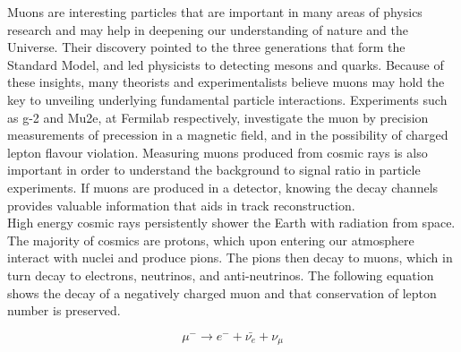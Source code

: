\documentclass[11pt,twocolumn]{article}
\begin{document}
\indent \indent
Muons are interesting particles that are important in many areas of physics research and may help in deepening our understanding of nature and the Universe. Their discovery pointed to the three generations that form the Standard Model, and led physicists to detecting mesons and quarks.\cite{symm} Because of these insights, many theorists and experimentalists believe muons may hold the key to unveiling underlying fundamental particle interactions. Experiments such as g-2 and Mu2e, at Fermilab respectively, investigate the muon by precision measurements of precession in a magnetic field, and in the possibility of charged lepton flavour violation. Measuring muons produced from cosmic rays is also important in order to understand the background to signal ratio in particle experiments. If muons are produced in a detector, knowing the decay channels provides valuable information that aids in track reconstruction. \\
\indent \indent
High energy cosmic rays persistently shower the Earth with radiation from space. The majority of cosmics are protons, which upon entering our atmosphere interact with nuclei and produce pions. The pions then decay to muons, which in turn decay to electrons, neutrinos, and anti-neutrinos. The following equation shows the decay of a negatively charged muon and that conservation of lepton number is preserved. \cite{mass}

\begin{equation}
\mu^{-} \rightarrow e^{-} + \bar{\nu_e} + \nu_{\mu}
\end{equation}  
\end{document}
